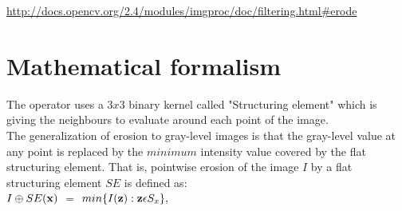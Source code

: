 \documentclass[12pt,a4paper]{article}
\begin{document}
\url{http://docs.opencv.org/2.4/modules/imgproc/doc/filtering.html#erode}

\section*{Mathematical formalism}

The operator uses a $3x3$ binary kernel called "Structuring element" which is giving the neighbours to evaluate around each point of the image. \\

The generalization of erosion to gray-level images is that the gray-level value at any point is replaced by the $minimum$ intensity value covered by the flat structuring element. That is, pointwise erosion of the image $I$ by a flat structuring element $SE$ is defined as:\\


\centering
$\displaystyle I \oplus SE (\bf x )$ 	$\textstyle =$ 	$\displaystyle min \{I({\bf z}): {\bf z} \epsilon S_x \},$

\vspace{0.5cm}
\end{document}
